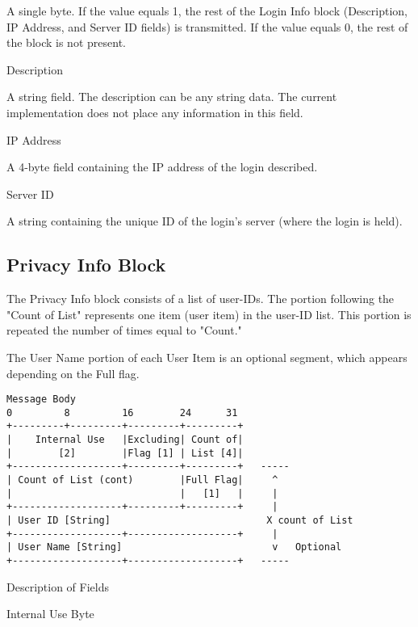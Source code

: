 \documentclass[titlepage,oneside]{book}
\begin{document}
\subpar{}   A single byte. If the value equals 1, the rest of the Login Info
  block (Description, IP Address, and Server ID fields) is
  transmitted. If the value equals 0, the rest of the block is not
  present.

\par{} Description

\subpar{}   A string field. The description can be any string data. The current
  implementation does not place any information in this field.

\par{} IP Address

\subpar{}   A 4-byte field containing the IP address of the login described.

\par{} Server ID

\subpar{}   A string containing the unique ID of the login's server
  (where the login is held).

\subsection{Privacy Info Block}

\par{} The Privacy Info block consists of a list of user-IDs. The
portion following the "Count of List" represents one item (user item)
in the user-ID list. This portion is repeated the number of times
equal to "Count."

\par{} The User Name portion of each User Item is an optional segment,
which appears depending on the Full flag.

\begin{verbatim}
Message Body
0         8         16        24      31
+---------+---------+---------+---------+
|    Internal Use   |Excluding| Count of|
|        [2]        |Flag [1] | List [4]|
+-------------------+---------+---------+   -----
| Count of List (cont)        |Full Flag|     ^
|                             |   [1]   |     |
+-------------------+---------+---------+     |
| User ID [String]                           X count of List
+-------------------+-------------------+     |
| User Name [String]                          v   Optional
+-------------------+-------------------+   -----
\end{verbatim}

\par{} Description of Fields

\par{} Internal Use Byte
\end{document}
